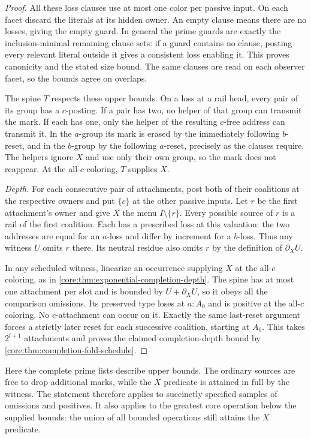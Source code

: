 \begin{proof}
All these loss clauses use at most one color per passive input.
On each facet discard the literals at its hidden owner. An empty
clause means there are no losses, giving the empty guard. In general
the prime guards are exactly the inclusion-minimal remaining clause sets:
if a guard contains no clause, posting every relevant literal
outside it gives a consistent loss enabling it. This proves
canonicity and the stated size bound. The same clauses are read on
each observer facet, so the bounds agree on overlaps.

The spine $T$ respects these upper bounds. On a loss at a rail head,
every pair of its group has a $c$-posting. If a pair has two, no
helper of that group can transmit the mark. If each has one, only
the helper of the resulting $c$-free address can transmit it.
In the $a$-group its mark is erased by the immediately following
$b$-reset, and in the $b$-group by the following $a$-reset, precisely
as the clauses require. The helpers ignore $X$ and use only their
own group, so the mark does not reappear. At the all-$c$ coloring,
$T$ supplies $X$.

\emph{Depth.}
For each consecutive pair of attachments, post both of their
coalitions at the respective owners and put $\{c\}$ at the other
passive inputs. Let $r$ be the first attachment's owner and give
$X$ the menu $I\setminus\{r\}$. Every possible source of $r$ is a
rail of the first coalition. Each has a prescribed loss at this
valuation: the two addresses are equal for an $a$-loss and differ
by increment for a $b$-loss. Thus any witness $U$ omits $r$ there.
Its neutral residue also omits $r$ by the definition of
$\partial_XU$.

In any scheduled witness, linearize an occurrence supplying $X$
at the all-$c$ coloring, as in
\cref{core:thm:exponential-completion-depth}. The spine has at most
one attachment per slot and is bounded by $U+\partial_XU$, so it
obeys all the comparison omissions. Its preserved type loses at
$a:A_0$ and is positive at the all-$c$ coloring. No $c$-attachment
can occur on it. Exactly the same last-reset argument forces a
strictly later reset for each successive coalition, starting at
$A_0$. This takes $2^{l+1}$ attachments and proves the claimed
completion-depth bound by \cref{core:thm:completion-fold-schedule}.
\end{proof}

Here the complete prime lists describe upper bounds. The ordinary
sources are free to drop additional marks, while the $X$ predicate
is attained in full by the witness. The statement therefore applies
to succinctly specified samples of omissions and positives. It also
applies to the greatest core operation below the supplied bounds:
the union of all bounded operations still attains the $X$ predicate.


